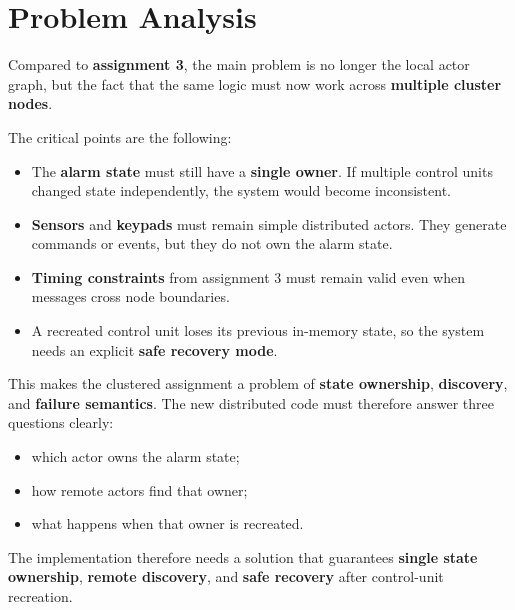 \clearpage
\section{Problem Analysis}

Compared to \textbf{assignment 3}, the main problem is no longer the local actor
graph, but the fact that the same logic must now work across \textbf{multiple
cluster nodes}.

The critical points are the following:
\begin{itemize}
    \item The \textbf{alarm state} must still have a \textbf{single owner}. If multiple control units changed state independently, the system would become inconsistent.
    \item \textbf{Sensors} and \textbf{keypads} must remain simple distributed actors. They generate commands or events, but they do not own the alarm state.
    \item \textbf{Timing constraints} from assignment 3 must remain valid even when messages cross node boundaries.
    \item A recreated control unit loses its previous in-memory state, so the system needs an explicit \textbf{safe recovery mode}.
\end{itemize}

This makes the clustered assignment a problem of \textbf{state ownership},
\textbf{discovery}, and \textbf{failure semantics}. The new distributed code must
therefore answer three questions clearly:
\begin{itemize}
    \item which actor owns the alarm state;
    \item how remote actors find that owner;
    \item what happens when that owner is recreated.
\end{itemize}

The implementation therefore needs a solution that guarantees \textbf{single
state ownership}, \textbf{remote discovery}, and \textbf{safe recovery} after
control-unit recreation.

